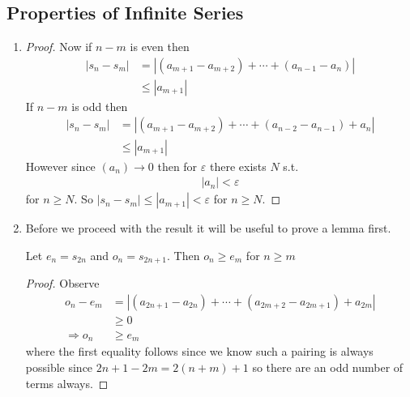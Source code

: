 \subsection{Properties of Infinite Series}

\begin{enumerate}[label=(\alph*)]
    \item 
    \begin{proof}
        Now if $n-m$ is even then
        \begin{align*}
            |s_n - s_m| &= |(a_{m+1} - a_{m+2}) + \cdots + (a_{n-1} - a_{n})| \\
            &\leq |a_{m+1}|
        \end{align*}
        If $n-m$ is odd then
        \begin{align*}
            |s_n - s_m| &= |(a_{m+1} - a_{m+2}) + \cdots + (a_{n-2} - a_{n-1}) +  a_{n}| \\
            &\leq |a_{m+1}|
        \end{align*}
        However since $(a_{n}) \rightarrow 0$ then for $\varepsilon$ there exists $N$ s.t.
        \begin{align*}
            |a_{n}| < \varepsilon 
        \end{align*}
        for $n \geq N$. So $|s_n - s_m| \leq |a_{m+1}| < \varepsilon$ for $n \geq N$.
    \end{proof}

    \item
    Before we proceed with the result it will be useful to prove a lemma first.
    \begin{lemma}
        Let $e_n=s_{2n}$ and $o_n=s_{2n+1}$. Then $o_n \geq e_m$ for $n\geq m$
    \end{lemma}
    \begin{proof}
        Observe
        \begin{align*}
            o_n - e_m &= |(a_{2n+1} - a_{2n}) + \cdots + (a_{2m+2} - a_{2m+1}) + a_{2m}| \\
            &\geq 0 \\
            \Rightarrow o_n &\geq e_m
        \end{align*}
        where the first equality follows since 
        we know such a pairing is always possible since $2n+1-2m=2(n+m)+1$ so there are
        an odd number of terms always.
    \end{proof}


\end{enumerate}
